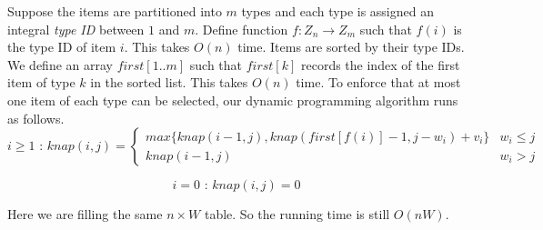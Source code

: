 \documentclass[11pt]{article}
\begin{document}
\begin{description}
\begin{enumerate}
Suppose the items are partitioned into $m$ types and each type is assigned an integral \emph{type
ID} between $1$ and $m$.  Define function $f:Z_n \rightarrow Z_m$ such that $f(i)$ is the type ID
of item $i$.  This takes $O(n)$ time.  Items are sorted by their type IDs.  We define an array
$first[1..m]$ such that $first[k]$ records the index of the first item of type $k$ in the sorted
list.  This takes $O(n)$ time.  To enforce that at most one item of each type can be selected, our dynamic programming algorithm runs as follows.\\

\[i\geq1 \textrm{  :  } knap(i,j)=\left\{\begin{array}{ll} max\{knap(i-1,j),knap(first[f(i)]-1,j-w_i)+v_i\} & w_i\leq j\\ knap(i-1,j) & w_i>j

\end{array}\right.\]

\[i=0 \textrm{  :  } knap(i,j)=0\]

Here we are filling the same $n \times W$ table.  So the running time is still $O(nW)$.


\end{enumerate}


\end{description}
\end{document}
